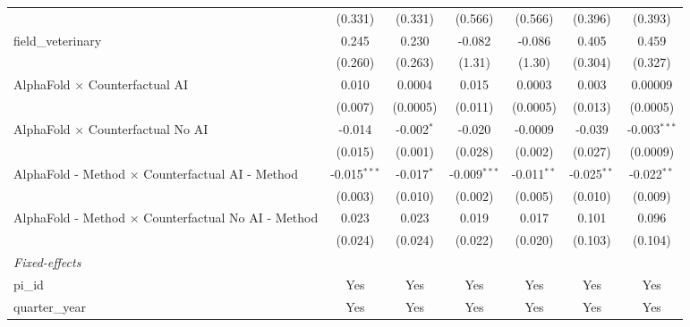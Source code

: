 \begin{tabular}{lcccccc}
                                                               & (0.331)        & (0.331)        & (0.566)        & (0.566)        & (0.396)        & (0.393)\\   
   field\_veterinary                                           & 0.245          & 0.230          & -0.082         & -0.086         & 0.405          & 0.459\\   
                                                               & (0.260)        & (0.263)        & (1.31)         & (1.30)         & (0.304)        & (0.327)\\   
   AlphaFold $\times$ Counterfactual AI                        & 0.010          & 0.0004         & 0.015          & 0.0003         & 0.003          & 0.00009\\   
                                                               & (0.007)        & (0.0005)       & (0.011)        & (0.0005)       & (0.013)        & (0.0005)\\   
   AlphaFold $\times$ Counterfactual No AI                     & -0.014         & -0.002$^{*}$   & -0.020         & -0.0009        & -0.039         & -0.003$^{***}$\\   
                                                               & (0.015)        & (0.001)        & (0.028)        & (0.002)        & (0.027)        & (0.0009)\\   
   AlphaFold - Method $\times$ Counterfactual AI - Method      & -0.015$^{***}$ & -0.017$^{*}$   & -0.009$^{***}$ & -0.011$^{**}$  & -0.025$^{**}$  & -0.022$^{**}$\\   
                                                               & (0.003)        & (0.010)        & (0.002)        & (0.005)        & (0.010)        & (0.009)\\   
   AlphaFold - Method $\times$ Counterfactual No AI - Method   & 0.023          & 0.023          & 0.019          & 0.017          & 0.101          & 0.096\\   
                                                               & (0.024)        & (0.024)        & (0.022)        & (0.020)        & (0.103)        & (0.104)\\   
   \midrule
   \emph{Fixed-effects}\\
   pi\_id                                                      & Yes            & Yes            & Yes            & Yes            & Yes            & Yes\\  
   quarter\_year                                               & Yes            & Yes            & Yes            & Yes            & Yes            & Yes\\  

\end{tabular}
